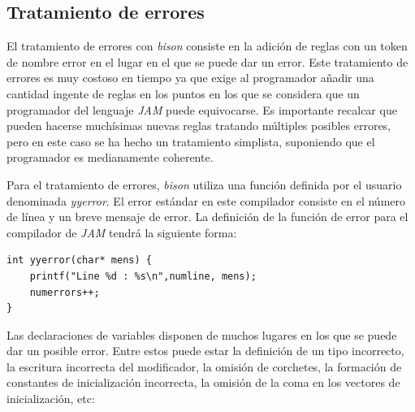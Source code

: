 \documentclass[a4paper,10pt]{article}
\begin{document}
\subsection{Tratamiento de errores}
El tratamiento de errores con \textit{bison} consiste en la adición de reglas con un token de nombre error en el lugar en el que se puede dar un error. Este tratamiento de errores es muy costoso en tiempo ya que exige al programador añadir una cantidad ingente de reglas en los puntos en los que se considera que un programador del lenguaje \textit{JAM} puede equivocarse. Es importante recalcar que pueden hacerse muchísimas nuevas reglas tratando múltiples posibles errores, pero en este caso se ha hecho un tratamiento simplista, suponiendo que el programador es medianamente coherente. 

Para el tratamiento de errores, \textit{bison} utiliza una función definida por el usuario denominada \textit{yyerror}. El error estándar en este compilador consiste en el número de línea y un breve mensaje de error. La definición de la función de error para el compilador de \textit{JAM} tendrá la siguiente forma:

\begin{lstlisting}
int yyerror(char* mens) {
	printf("Line %d : %s\n",numline, mens);
	numerrors++;
}
\end{lstlisting}

Las declaraciones de variables disponen de muchos lugares en los que se puede dar un posible error. Entre estos puede estar la definición de un tipo incorrecto, la escritura incorrecta del modificador, la omisión de corchetes, la formación de constantes de inicialización incorrecta, la omisión de la coma en los vectores de inicialización, etc:
\end{document}
